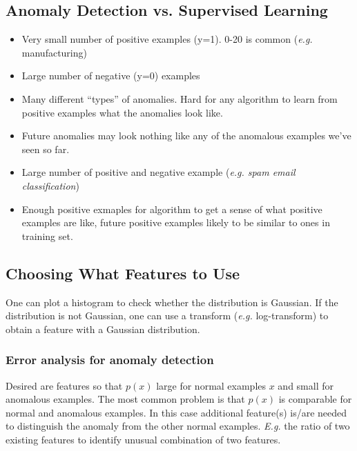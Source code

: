 \documentclass[a4paper,twoside,10pt]{article}
\begin{document}
\subsection{Anomaly Detection vs. Supervised Learning}
\begin{minipage}[t]{.45\textwidth}
  \begin{itemize}
    \item Very small number of positive examples (y=1). 0-20 is common (\emph{e.g.} manufacturing)
    \item Large number of negative (y=0) examples
    \item Many different ``types'' of anomalies.
      Hard for any algorithm to learn from positive examples what the anomalies look like.
    \item Future anomalies may look nothing like any of the anomalous examples we've seen so far.
  \end{itemize}
\end{minipage}
\begin{minipage}[t]{.45\textwidth}
  \begin{itemize}
    \item Large number of positive and negative example (\emph{e.g. spam email classification})
    \item Enough positive exmaples for algorithm to get a sense of what positive examples are like,
      future positive examples likely to be similar to ones in training set.
  \end{itemize}
\end{minipage}

\subsection{Choosing What Features to Use}
One can plot a histogram to check whether the distribution is Gaussian. If the distribution is not Gaussian, one can use a transform (\emph{e.g.} log-transform) to obtain a feature with a Gaussian distribution.

\subsubsection{Error analysis for anomaly detection}
Desired are features so that $p(x)$ large for normal examples $x$ and small for anomalous examples.
The most common problem is that $p(x)$ is comparable for normal and anomalous examples.
In this case additional feature(s) is/are needed to distinguish the anomaly from the other normal examples.
\emph{E.g.} the ratio of two existing features to identify unusual combination of two features.
\end{document}

